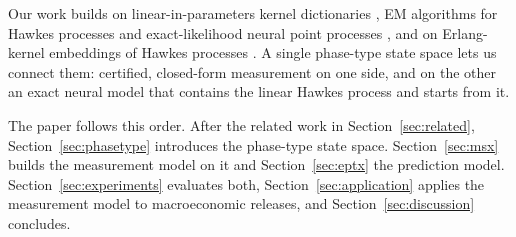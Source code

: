 Our work builds on linear-in-parameters kernel dictionaries \citep{bacry2015hawkes}, EM algorithms
for Hawkes processes \citep{veen2008estimation,zhou2013learning} and exact-likelihood neural point
processes \citep{omi2019fully,shchur2020intensity}, and on Erlang-kernel embeddings of Hawkes
processes \citep{duarte2019stability}. A single phase-type state space lets us connect
them: certified, closed-form measurement on one side, and on the other an exact neural model that
contains the linear Hawkes process and starts from it.

The paper follows this order. After the related work in Section~\ref{sec:related},
Section~\ref{sec:phasetype} introduces the phase-type state space. Section~\ref{sec:msx} builds the
measurement model on it and Section~\ref{sec:eptx} the prediction model. Section~\ref{sec:experiments}
evaluates both, Section~\ref{sec:application} applies the measurement model to macroeconomic
releases, and Section~\ref{sec:discussion} concludes.
